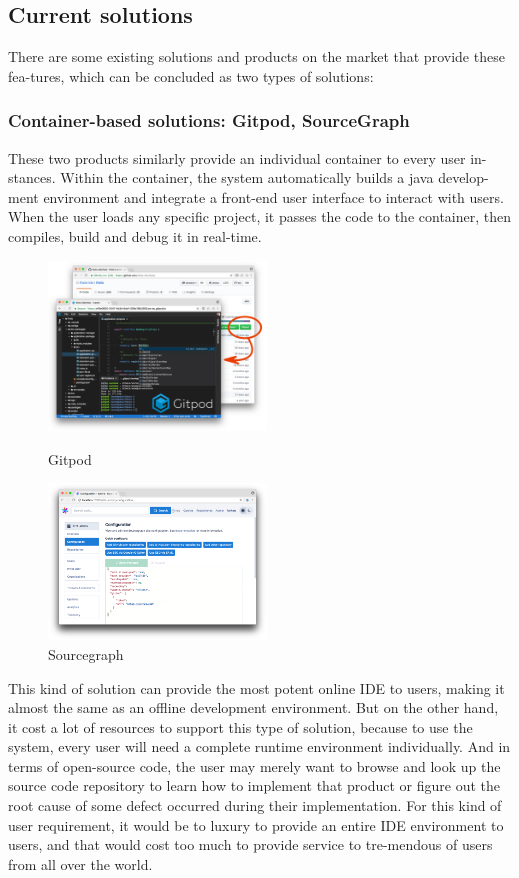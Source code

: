 \documentclass[runningheads]{llncs}
\begin{document}
\subsection{Current solutions}
There are some existing solutions and products on the market that provide these fea-tures, which can be concluded as two types of solutions:

\subsubsection{Container-based solutions: Gitpod\cite{Gitpod}, SourceGraph\cite{SourceGraph}}

These two products similarly provide an individual container to every user in-stances. Within the container, the system automatically builds a java develop-ment environment and integrate a front-end user interface to interact with users. When the user loads any specific project, it passes the code to the container, then compiles, build and debug it in real-time.

\begin{figure}[H]
	\centering
	\begin{minipage}[t]{0.48\textwidth}
	\centering
	\includegraphics[width=5.8cm]{pic/gitpod.png}
	\caption{Gitpod}
	\end{minipage}
	\begin{minipage}[t]{0.48\textwidth}
	\centering
	\includegraphics[width=5.8cm]{pic/sourcegraph.png}
	\caption{Sourcegraph}
	\end{minipage}
\end{figure}

This kind of solution can provide the most potent online IDE to users, making it almost the same as an offline development environment. But on the other hand, it cost a lot of resources to support this type of solution, because to use the system, every user will need a complete runtime environment individually. And in terms of open-source code, the user may merely want to browse and look up the source code repository to learn how to implement that product or figure out the root cause of some defect occurred during their implementation. For this kind of user requirement, it would be to luxury to provide an entire IDE environment to users, and that would cost too much to provide service to tre-mendous of users from all over the world.
\end{document}
